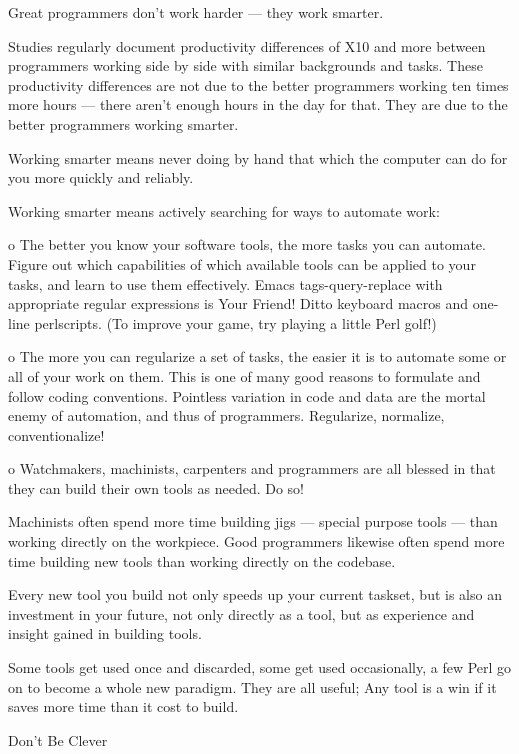 Great programmers don't work harder  --- they work smarter.

Studies regularly document productivity differences of X10 and more between 
programmers working side by side with similar backgrounds and tasks.  These 
productivity differences are not due to the better programmers working ten times 
more hours  --- there aren't enough hours in the day for that.  They are due to the 
better programmers working smarter.

Working smarter means never doing by hand that which the computer can do for you 
more quickly and reliably.

Working smarter means actively searching for ways to automate work:

 o The better you know your software tools, the more tasks you 
   can automate.  Figure out which capabilities of which available 
   tools can be applied to your tasks, and learn to use them 
   effectively.  Emacs tags-query-replace with appropriate regular 
   expressions is Your Friend!  Ditto keyboard macros and one-line 
   perlscripts.  (To improve your game, try playing a little Perl golf!)

 o The more you can regularize a set of tasks, the easier it is to 
   automate some or all of your work on them.  This is one of many 
   good reasons to formulate and follow coding conventions. Pointless 
   variation in code and data are the mortal enemy of automation, and 
   thus of programmers.  Regularize, normalize, conventionalize!

 o Watchmakers, machinists, carpenters and programmers are all blessed 
   in that they can build their own tools as needed.  Do so!

   Machinists often spend more time building jigs  --- special purpose 
   tools  --- than  working directly on the workpiece.  Good programmers 
   likewise often spend more time building new tools than working directly 
   on the codebase.

   Every new tool you build not only speeds up your current taskset, but 
   is also an investment in your future, not only directly as a tool, but 
   as experience and insight gained in building tools.

   Some tools get used once and discarded, some get used occasionally, a 
   few Perl go on to become a whole new paradigm.  They are all useful; 
   Any tool is a win if it saves more time than it cost to build.




Don't Be Clever 

